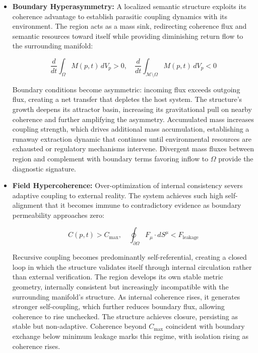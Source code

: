 \begin{itemize}
    
    \item \textbf{Boundary Hyperasymmetry:} A localized semantic structure exploits its coherence advantage to establish parasitic coupling dynamics with its environment. The region acts as a mass sink, redirecting coherence flux and semantic resources toward itself while providing diminishing return flow to the surrounding manifold:

    \begin{equation}
    \frac{d}{dt}\int_{\Omega} M(p,t) \, dV_p > 0, \quad \frac{d}{dt}\int_{\mathcal{M}\setminus\Omega} M(p,t) \, dV_p < 0
    \end{equation}

    Boundary conditions become asymmetric: incoming flux exceeds outgoing flux, creating a net transfer that depletes the host system. The structure's growth deepens its attractor basin, increasing its gravitational pull on nearby coherence and further amplifying the asymmetry. Accumulated mass increases coupling strength, which drives additional mass accumulation, establishing a runaway extraction dynamic that continues until environmental resources are exhausted or regulatory mechanisms intervene. Divergent mass fluxes between region and complement with boundary terms favoring inflow to \(\Omega\) provide the diagnostic signature.

    \item \textbf{Field Hypercoherence:} Over-optimization of internal consistency severs adaptive coupling to external reality. The system achieves such high self-alignment that it becomes immune to contradictory evidence as boundary permeability approaches zero:

    \begin{equation}
    C(p,t) > C_{\text{max}}, \quad \oint_{\partial \Omega} F_\mu \cdot dS^\mu < F_{\text{leakage}}
    \end{equation}

    Recursive coupling becomes predominantly self-referential, creating a closed loop in which the structure validates itself through internal circulation rather than external verification. The region develops its own stable metric geometry, internally consistent but increasingly incompatible with the surrounding manifold's structure. As internal coherence rises, it generates stronger self-coupling, which further reduces boundary flux, allowing coherence to rise unchecked. The structure achieves closure, persisting as stable but non-adaptive. Coherence beyond \(C_{\text{max}}\) coincident with boundary exchange below minimum leakage marks this regime, with isolation rising as coherence rises.
    

\end{itemize}
